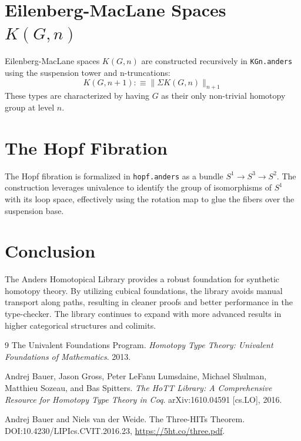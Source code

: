 \documentclass[11pt]{article}
\begin{document}
\section{Eilenberg-MacLane Spaces $K(G, n)$}

Eilenberg-MacLane spaces $K(G, n)$ are constructed recursively in \texttt{KGn.anders} using the suspension tower and n-truncations:
\begin{equation}
    K(G, n+1) :\equiv \| \Sigma K(G, n) \|_{n+1}
\end{equation}
These types are characterized by having $G$ as their only non-trivial homotopy group at level $n$.

\section{The Hopf Fibration}

The Hopf fibration is formalized in \texttt{hopf.anders} as a bundle $S^1 \to S^3 \to S^2$. The construction leverages univalence to identify the group of isomorphisms of $S^1$ with its loop space, effectively using the rotation map to glue the fibers over the suspension base.

\section{Conclusion}

The Anders Homotopical Library provides a robust foundation for synthetic homotopy theory. By utilizing cubical foundations, the library avoids manual transport along paths, resulting in cleaner proofs and better performance in the type-checker. The library continues to expand with more advanced results in higher categorical structures and colimits.

\begin{thebibliography}{9}
The Univalent Foundations Program.
\textit{Homotopy Type Theory: Univalent Foundations of Mathematics}.
2013.

Andrej Bauer, Jason Gross, Peter LeFanu Lumsdaine, Michael Shulman, Matthieu Sozeau, and Bas Spitters.
\textit{The HoTT Library: A Comprehensive Resource for Homotopy Type Theory in Coq}.
arXiv:1610.04591 [cs.LO], 2016.

Andrej Bauer and Niels van der Weide.
The Three-HITs Theorem.
DOI:10.4230/LIPIcs.CVIT.2016.23, \url{https://5ht.co/three.pdf}.

\end{thebibliography}
\end{document}
